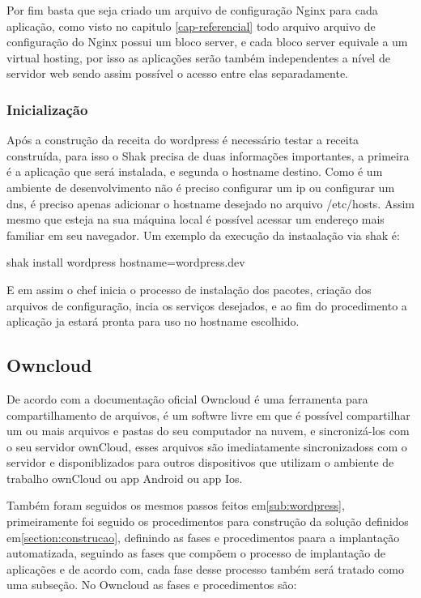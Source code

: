 Por fim basta que seja criado um arquivo de configuração Nginx para cada aplicação,
como visto no capitulo \ref{cap-referencial} todo arquivo arquivo de configuração
do Nginx possui um bloco server, e cada bloco server equivale a um virtual hosting,
por isso as aplicações serão também independentes a nível de servidor web sendo assim
possível o acesso entre elas separadamente.

\subsubsection{Inicialização}

Após a construção da receita do wordpress é necessário testar a receita construída,
para isso o Shak precisa de duas informações importantes, a primeira é a aplicação
que será instalada, e segunda o hostname destino. Como é um ambiente de desenvolvimento
não é preciso configurar um ip ou configurar um dns, é preciso apenas adicionar o
hostname desejado no arquivo /etc/hosts. Assim mesmo que esteja na sua máquina local
é possível acessar um endereço mais familiar em seu navegador. Um exemplo da execução
da instaalação via shak é:

\begin{center}
shak install wordpress hostname=wordpress.dev
\end{center}

E em assim o chef inicia o processo de instalação dos pacotes, criação dos arquivos
de configuração, incia os serviços desejados, e ao fim do procedimento a aplicação
ja estará pronta para uso no hostname escolhido.


\subsection{Owncloud}
\label{sub:owncloud}

De acordo com a documentação oficial\cite{owncloud} Owncloud é uma ferramenta
para compartilhamento de arquivos, é um softwre livre em que é possível compartilhar
um ou mais arquivos e pastas do seu computador na nuvem, e sincronizá-los com o seu
servidor ownCloud, esses arquivos são imediatamente sincronizadoss com o servidor
e disponiblizados para outros dispositivos que utilizam o ambiente de trabalho
ownCloud ou app Android ou app Ios.

Também foram seguidos os mesmos passos feitos em\ref{sub:wordpress}, primeiramente
foi seguido os procedimentos para construção da solução definidos em\ref{section:construcao},
definindo as fases e procedimentos paara a implantação automatizada, seguindo as
fases que compõem o processo de implantação de aplicações e de acordo com\cite{omg2006},
cada fase desse processo também será tratado como uma subseção. No Owncloud as
fases e procedimentos são:

